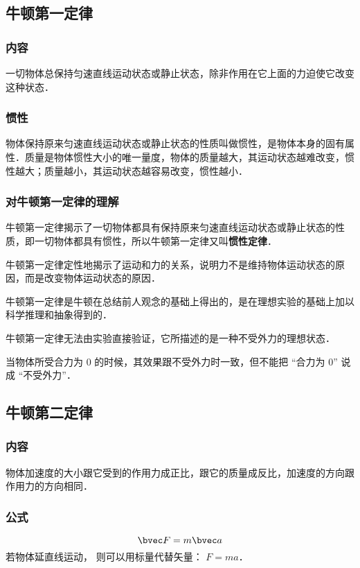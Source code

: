 

\subsection{牛顿第一定律}

\subsubsection{内容}
一切物体总保持匀速直线运动状态或静止状态，除非作用在它上面的力迫使它改变这种状态．

\subsubsection{惯性}
物体保持原来匀速直线运动状态或静止状态的性质叫做惯性，是物体本身的固有属性．质量是物体惯性大小的唯一量度，物体的质量越大，其运动状态越难改变，惯性越大；质量越小，其运动状态越容易改变，惯性越小．

\subsubsection{对牛顿第一定律的理解}
牛顿第一定律揭示了一切物体都具有保持原来匀速直线运动状态或静止状态的性质，即一切物体都具有惯性，所以牛顿第一定律又叫\textbf{惯性定律}．

牛顿第一定律定性地揭示了运动和力的关系，说明力不是维持物体运动状态的原因，而是改变物体运动状态的原因．

牛顿第一定律是牛顿在总结前人观念的基础上得出的，是在理想实验的基础上加以科学推理和抽象得到的．

牛顿第一定律无法由实验直接验证，它所描述的是一种不受外力的理想状态．

当物体所受合力为 $0$ 的时候，其效果跟不受外力时一致，但不能把 “合力为 $0$” 说成 “不受外力”．

\subsection{牛顿第二定律}
\subsubsection{内容}
物体加速度的大小跟它受到的作用力成正比，跟它的质量成反比，加速度的方向跟作用力的方向相同．

\subsubsection{公式}
\begin{equation}
\bvec F=m\bvec a
\end{equation}
若物体延直线运动， 则可以用标量代替矢量： $F=m a$．

